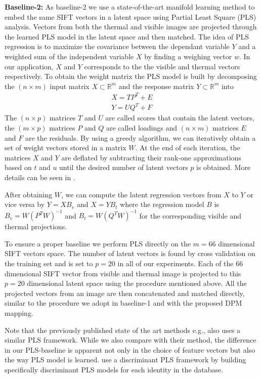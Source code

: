 \documentclass[smallextended,natbib]{svjour3}       \usepackage{graphicx}
\begin{document}
\noindent\textbf{Baseline-2:} As baseline-2 we use a state-of-the-art manifold learning method to embed the same SIFT vectors in a latent space using Partial Least Square (PLS) analysis. Vectors from both the thermal and visible images are projected through the learned PLS model in the latent space and then matched. The idea of PLS regression is to maximize the covariance between the dependant variable $Y$ and a weighted sum of the independent variable $X$ by finding a weighing vector $w$. In our application, $X$ and $Y$ corresponds to the the visible and thermal vectors respectively. To obtain the weight matrix the PLS model is built by decomposing the $(n\times m)$ input matrix $X\subset \mathbb{R}^m$ and the response matrix $Y\subset \mathbb{R}^m$ into
\begin{equation}
\begin{aligned}
X=TP^{T}+E \\
Y=UQ^{T}+F
\end{aligned}
\end{equation}
The $(n\times p)$ matrices $T$ and $U$ are called scores that contain the latent vectors, the $(m\times p)$ matrices $P$ and $Q$ are called loadings and $(n\times m)$ matrices $E$ and $F$ are the residuals. By using a greedy algorithm, we can iteratively obtain a set of weight vectors stored in a matrix $W$. At the end of each iteration, the matrices $X$ and $Y$ are deflated by subtracting their rank-one approximations based on $t$ and $u$ until the desired number of latent vectors $p$ is obtained. More details can be seen in \cite{rosipal2006}.

After obtaining $W$, we can compute the latent regression vectors from $X$ to $Y$ or vice versa by $Y=XB_{v}$ and $X=YB_{t}$ where the regression model $B$ is $B_{v}=W(P^{T}W)^{-1}$ and $B_{t}=W(Q^{T}W)^{-1}$ for the corresponding visible and thermal projections.

To ensure a proper baseline we perform PLS directly on the $m=66$ dimensional SIFT vectors space. The number of latent vectors is found by cross validation on the training set and is set to $p=20$ in all of our experiments. Each of the $66$ dimensional SIFT vector from visible and thermal image is projected to this $p=20$ dimensional latent space using the procedure mentioned above. All the projected vectors from an image are then concatenated and matched directly, similar to the procedure we adopt in baseline-1 and with the proposed DPM mapping.

Note that the previously published state of the art methods e.g., \cite{hu2015} also uses a similar PLS framework. While we also compare with their method, the difference in our PLS-baseline is apparent not only in the choice of feature vectors but also the way PLS model is learned. \cite{hu2015} use a discriminant PLS framework by building specifically discriminant PLS models for each identity in the database. 
\end{document}
